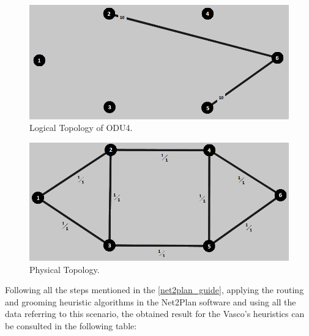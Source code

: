 \begin{figure}[H]
\centering
\includegraphics[width=13cm]{sdf/heuristic/figures/topologies/opaque_protec/medium/logical_topology_odu4_medium}
\caption{Logical Topology of ODU4.}
\label{logical_ODU4_protec_ref_medium_heuristic}
\end{figure}

\begin{figure}[H]
\centering
\includegraphics[width=13cm]{sdf/heuristic/figures/topologies/opaque_protec/medium/physical_topology_medium}
\caption{Physical Topology.}
\label{physical_topology_protec_ref_medium_heuristic}
\end{figure}

Following all the steps mentioned in the \ref{net2plan_guide}, applying the routing and grooming heuristic algorithms in the Net2Plan software and using all the data referring to this scenario, the obtained result for the Vasco's heuristics can be consulted in the following table:

